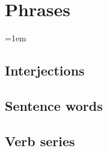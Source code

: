 \chapter{Phrases}
\parindent=0pt
\hangindent=1em
\begin{fullwidth}
\section{Interjections}
\section{Sentence words}
\section{Verb series}
\end{fullwidth}

